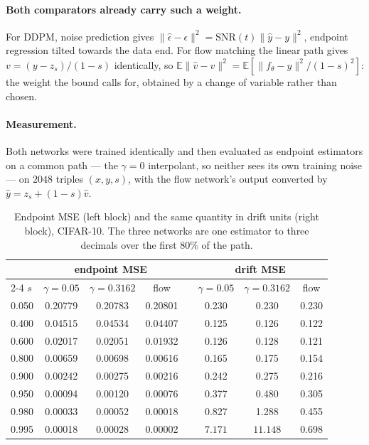 \documentclass[11pt,a4paper]{article}
\def\E{\mathbb{E}}
\begin{document}
\paragraph{Both comparators already carry such a weight.} For DDPM, noise
prediction gives $\|\hat\epsilon-\epsilon\|^2=\mathrm{SNR}(t)\|\hat y-y\|^2$,
endpoint regression tilted towards the data end. For flow matching the linear
path gives $v=(y-z_s)/(1-s)$ identically, so
$\E\|\hat v-v\|^2=\E[\|f_\theta-y\|^2/(1-s)^2]$: the weight the bound calls for,
obtained by a change of variable rather than chosen.

\paragraph{Measurement.} Both networks were trained identically and then
evaluated as endpoint estimators on a common path --- the $\gamma=0$ interpolant,
so neither sees its own training noise --- on $2048$ triples $(x,y,s)$, with the
flow network's output converted by $\hat y=z_s+(1-s)\hat v$.

\begin{table}[h]
\centering
\caption{Endpoint MSE (left block) and the same quantity in drift units (right
block), CIFAR-10. The three networks are one estimator to three decimals over
the first $80\%$ of the path.}
\label{tab:weighting}
\begin{tabular}{lccc c ccc}
\toprule
& \multicolumn{3}{c}{endpoint MSE} & & \multicolumn{3}{c}{drift MSE}\\
\cmidrule{2-4}\cmidrule{6-8}
$s$ & $\gamma{=}0.05$ & $\gamma{=}0.3162$ & flow & & $\gamma{=}0.05$ & $\gamma{=}0.3162$ & flow\\
\midrule
0.050 & 0.20779 & 0.20783 & 0.20801 & & 0.230 & 0.230 & 0.230\\
0.400 & 0.04515 & 0.04534 & 0.04407 & & 0.125 & 0.126 & 0.122\\
0.600 & 0.02017 & 0.02051 & 0.01932 & & 0.126 & 0.128 & 0.121\\
0.800 & 0.00659 & 0.00698 & 0.00616 & & 0.165 & 0.175 & 0.154\\
0.900 & 0.00242 & 0.00275 & 0.00216 & & 0.242 & 0.275 & 0.216\\
0.950 & 0.00094 & 0.00120 & 0.00076 & & 0.377 & 0.480 & 0.305\\
0.980 & 0.00033 & 0.00052 & 0.00018 & & 0.827 & 1.288 & 0.455\\
0.995 & 0.00018 & 0.00028 & 0.00002 & & $\mathbf{7.171}$ & $\mathbf{11.148}$ & 0.698\\
\bottomrule
\end{tabular}
\end{table}
\end{document}
